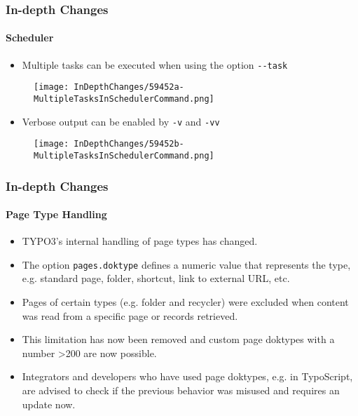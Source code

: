 
\begin{frame}[fragile]
	\frametitle{In-depth Changes}
	\framesubtitle{Scheduler}

	\lstset{basicstyle=\tiny\ttfamily}

	\begin{itemize}
		\item Multiple tasks can be executed when using the option \texttt{-}\texttt{-}\texttt{task}
	\end{itemize}

	\begin{figure}
		\texttt{[image: InDepthChanges/59452a-MultipleTasksInSchedulerCommand.png]}
	\end{figure}

	\begin{itemize}
		\item Verbose output can be enabled by \texttt{-}\texttt{v} and \texttt{-}\texttt{vv}
	\end{itemize}

	\begin{figure}
		\texttt{[image: InDepthChanges/59452b-MultipleTasksInSchedulerCommand.png]}
	\end{figure}

\end{frame}


\begin{frame}[fragile]
	\frametitle{In-depth Changes}
	\framesubtitle{Page Type Handling}

	\begin{itemize}
		\item TYPO3's internal handling of page types has changed.
		\item The option \texttt{pages.doktype} defines a numeric value that represents the type,
			e.g. standard page, folder, shortcut, link to external URL, etc.
		\item Pages of certain types (e.g. folder and recycler) were excluded when content was
			read from a specific page or records retrieved.
		\item This limitation has now been removed  and custom page doktypes with a number >200
			are now possible.
		\item Integrators and developers who have used page doktypes, e.g. in TypoScript,
			are advised to check if the previous behavior was misused and requires an update now.
	\end{itemize}

\end{frame}

